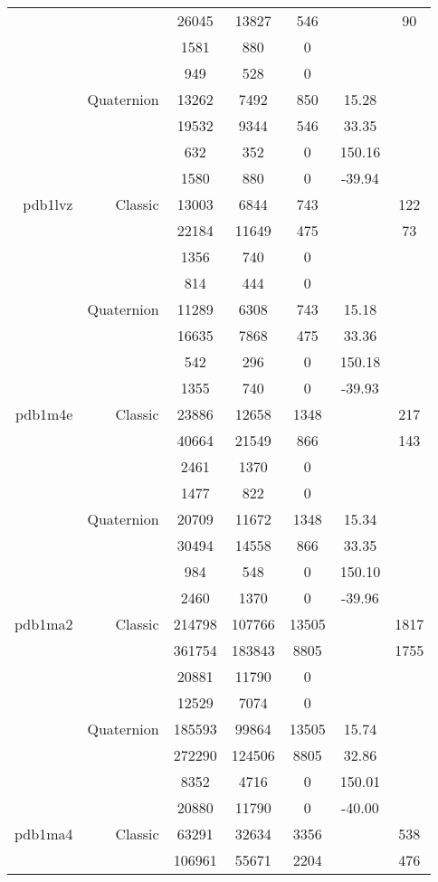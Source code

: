 \begin{xltabular}{\textwidth}{r|rcccSc}
& & 26045 & 13827 & 546 & & 90 \\
& & 1581 & 880 & 0 & & \\
& & 949 & 528 & 0 & & \\
& Quaternion & 13262 & 7492 & 850 & 15.28 & \\
& & 19532 & 9344 & 546 & 33.35 & \\
& & 632 & 352 & 0 & 150.16 & \\
& & 1580 & 880 & 0 & -39.94 & \\ \addlinespace
pdb1lvz & Classic & 13003 & 6844 & 743 & & 122 \\
& & 22184 & 11649 & 475 & & 73 \\
& & 1356 & 740 & 0 & & \\
& & 814 & 444 & 0 & & \\
& Quaternion & 11289 & 6308 & 743 & 15.18 & \\
& & 16635 & 7868 & 475 & 33.36 & \\
& & 542 & 296 & 0 & 150.18 & \\
& & 1355 & 740 & 0 & -39.93 & \\ \addlinespace
pdb1m4e & Classic & 23886 & 12658 & 1348 & & 217 \\
& & 40664 & 21549 & 866 & & 143 \\
& & 2461 & 1370 & 0 & & \\
& & 1477 & 822 & 0 & & \\
& Quaternion & 20709 & 11672 & 1348 & 15.34 & \\
& & 30494 & 14558 & 866 & 33.35 & \\
& & 984 & 548 & 0 & 150.10 & \\
& & 2460 & 1370 & 0 & -39.96 & \\ \addlinespace
pdb1ma2 & Classic & 214798 & 107766 & 13505 & & 1817 \\
& & 361754 & 183843 & 8805 & & 1755 \\
& & 20881 & 11790 & 0 & & \\
& & 12529 & 7074 & 0 & & \\
& Quaternion & 185593 & 99864 & 13505 & 15.74 & \\
& & 272290 & 124506 & 8805 & 32.86 & \\
& & 8352 & 4716 & 0 & 150.01 & \\
& & 20880 & 11790 & 0 & -40.00 & \\ \addlinespace
pdb1ma4 & Classic & 63291 & 32634 & 3356 & & 538 \\
& & 106961 & 55671 & 2204 & & 476 \\

\end{xltabular}
